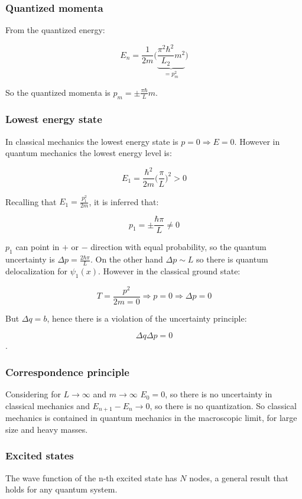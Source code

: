     \subsubsection{Quantized momenta}
    From the quantized energy:

    $$E_n = \frac{1}{2m}\biggl(\underbrace{\frac{\pi^2\hbar^2}{L_2}m^2}_{=p_m^2}\biggr)$$

    So the quantized momenta is $p_m = \pm \frac{\pi\hbar}{L}m$.

    \subsubsection{Lowest energy state}
    In classical mechanics the lowest energy state is $p = 0\Rightarrow E = 0$.
    However in quantum mechanics the lowest energy level is:

    $$E_1 = \frac{\hbar^2}{2m}\biggl(\frac{\pi}{L}\biggr)^2 > 0$$

    Recalling that $E_1 = \frac{p_1^2}{2m}$, it is inferred that:

    $$p_1 = \pm \frac{\hbar\pi}{L}\neq 0$$

    $p_1$ can point in $+$ or $-$ direction with equal probability, so the quantum uncertainty is $\Delta p =\frac{2\hbar\pi}{L}$.
    On the other hand $\Delta p \sim L$ so there is quantum delocalization for $\psi_1(x)$.
    However in the classical ground state:

    $$T = \frac{p^2}{2m = 0}\Rightarrow p = 0\Rightarrow \Delta p = 0$$

    But $\Delta q = b$, hence there is a violation of the uncertainty principle:

    $$\Delta q\Delta p = 0$$.

    \subsubsection{Correspondence principle}
    Considering for $L\rightarrow\infty$ and $m\rightarrow\infty$ $E_0 = 0$, so there is no uncertainty in classical mechanics and $E_{n+1}-E_n \rightarrow 0$, so there is no quantization.
    So classical mechanics is contained in quantum mechanics in the macroscopic limit, for large size and heavy masses.

    \subsubsection{Excited states}
    The wave function of the n-th excited state has $N$ nodes, a general result that holds for any quantum system.

